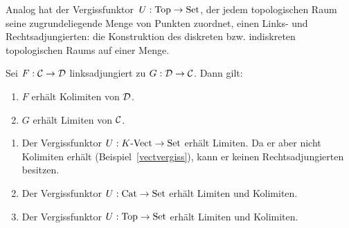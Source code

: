 \begin{bsp}Analog hat der Vergissfunktor~$U : \mathrm{Top} \to \mathrm{Set}$, der jedem
topologischen Raum seine zugrundeliegende Menge von Punkten zuordnet, einen
Links- und Rechtsadjungierten: die Konstruktion des diskreten bzw. indiskreten
topologischen Raums auf einer Menge.\end{bsp}

\begin{prop}
Sei $F:\mathcal{C}\to\mathcal{D}$ linksadjungiert zu $G:\mathcal{D}\to\mathcal{C}$. Dann gilt:
\begin{enumerate}
\item $F$ erhält Kolimiten von $\mathcal{D}$.
\item $G$ erhält Limiten von $\mathcal{C}$.
\end{enumerate}
\end{prop}

\begin{kor}\label{vergissstetig}
\begin{enumerate}
\item Der Vergissfunktor $U:{K\text{-}\mathrm{Vect}} \to \mathrm{Set}$ erhält Limiten.
Da er aber nicht Kolimiten erhält (Beispiel~\ref{vectvergiss}), kann er keinen
Rechtsadjungierten besitzen.
\item \label{vergisscat}Der Vergissfunktor $U:\mathrm{Cat} \to \mathrm{Set}$ erhält Limiten und Kolimiten.
\item Der Vergissfunktor $U:\mathrm{Top} \to \mathrm{Set}$ erhält Limiten und Kolimiten.
\end{enumerate}
\end{kor}

